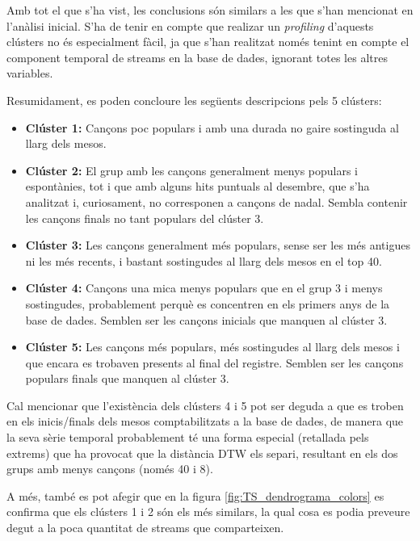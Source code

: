 Amb tot el que s'ha vist, les conclusions són similars a les que s'han mencionat en l'anàlisi inicial. S'ha de tenir en compte que realizar un \textit{profiling} d'aquests clústers no és especialment fàcil, ja que s'han realitzat només tenint en compte el component temporal de streams en la base de dades, ignorant totes les altres variables.

Resumidament, es poden concloure les següents descripcions pels 5 clústers:
\begin{itemize}
    \item \textbf{Clúster 1:} Cançons poc populars i amb una durada no gaire sostinguda al llarg dels mesos.
    
    \item \textbf{Clúster 2:} El grup amb les cançons generalment menys populars i espontànies, tot i que amb alguns hits puntuals al desembre, que s'ha analitzat i, curiosament, no corresponen a cançons de nadal. Sembla contenir les cançons finals no tant populars del clúster 3.
    
    \item \textbf{Clúster 3:} Les cançons generalment més populars, sense ser les més antigues ni les més recents, i bastant sostingudes al llarg dels mesos en el top 40.
    
    \item \textbf{Clúster 4:} Cançons una mica menys populars que en el grup 3 i menys sostingudes, probablement perquè es concentren en els primers anys de la base de dades. Semblen ser les cançons inicials que manquen al clúster 3.
    
    \item \textbf{Clúster 5:} Les cançons més populars, més sostingudes al llarg dels mesos i que encara es trobaven presents al final del registre. Semblen ser les cançons populars finals que manquen al clúster 3.
\end{itemize}

Cal mencionar que l'existència dels clústers 4 i 5 pot ser deguda a que es troben en els inicis/finals dels mesos comptabilitzats a la base de dades, de manera que la seva sèrie temporal probablement té una forma especial (retallada pels extrems) que ha provocat que la distància DTW els separi, resultant en els dos grups amb menys cançons (només 40 i 8).

A més, també es pot afegir que en la figura \ref{fig:TS_dendrograma_colors} es confirma que els clústers 1 i 2 són els més similars, la qual cosa es podia preveure degut a la poca quantitat de streams que comparteixen.
